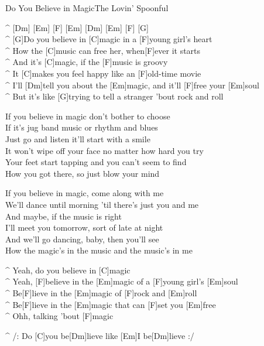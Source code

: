 \begin{song}{Do You Believe in Magic}{The Lovin' Spoonful}

\begin{guitar}
^ [Dm] [Em] [F] [Em] [Dm] [Em] [F] [G]\\

^ [G]Do you believe in [C]magic in a [F]young girl's heart\\
^ How the [C]music can free her, when[F]ever it starts\\
^ And it's [C]magic, if the [F]music is groovy\\
^ It [C]makes you feel happy like an [F]old-time movie\\
^ I'll [Dm]tell you about the [Em]magic, and it'll [F]free your [Em]soul\\
^ But it's like [G]trying to tell a stranger 'bout rock and roll\\
\end{guitar}

\begin{guitar}
If you believe in magic don't bother to choose\\
If it's jug band music or rhythm and blues\\
Just go and listen it'll start with a smile\\
It won't wipe off your face no matter how hard you try\\
Your feet start tapping and you can't seem to find\\
How you got there, so just blow your mind\\
\end{guitar}

\begin{guitar}
If you believe in magic, come along with me\\
We'll dance until morning 'til there's just you and me\\
And maybe, if the music is right\\
I'll meet you tomorrow, sort of late at night\\
And we'll go dancing, baby, then you'll see\\
How the magic's in the music and the music's in me\\
\end{guitar}

\begin{guitar}
^ Yeah, do you believe in [C]magic\\
^ Yeah, [F]believe in the [Em]magic of a [F]young girl's [Em]soul\\
^ Be[F]lieve in the [Em]magic of [F]rock and [Em]roll\\
^ Be[F]lieve in the [Em]magic that can [F]set you [Em]free\\
^ Ohh, talking 'bout [F]magic\\
\end{guitar}

\begin{guitar}
^ /: Do [C]you be[Dm]lieve like [Em]I  be[Dm]lieve :/\\
\end{guitar}
\end{song}
